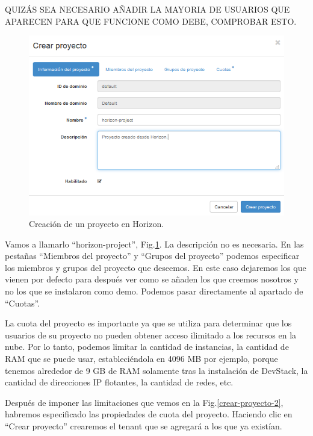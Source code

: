 \begin{tcolorbox}[colback=red!5!red,colframe=red!75!black]
QUIZÁS SEA NECESARIO AÑADIR LA MAYORIA DE USUARIOS QUE APARECEN PARA QUE FUNCIONE COMO DEBE, COMPROBAR ESTO.
\end{tcolorbox}

\begin{figure}
    \centering
    \includegraphics[width=1\textwidth]{imagenes/capitulo6/crear-proyecto-1.PNG}
    \caption{Creación de un proyecto en Horizon.}
	\vspace{0.3cm}
    \label{crear-proyecto-1}
\end{figure}

Vamos a llamarlo “horizon-project”, Fig.\ref{crear-proyecto-1}. La descripción no es necesaria. En las pestañas “Miembros del proyecto” y “Grupos del proyecto” podemos especificar los miembros y grupos del proyecto que deseemos. En este caso dejaremos los que vienen por defecto para después ver como se añaden los que creemos nosotros y no los que se instalaron como demo. Podemos pasar directamente al apartado de “Cuotas”.

La cuota del proyecto es importante ya que se utiliza para determinar que los usuarios de su proyecto no pueden obtener acceso ilimitado a los recursos en la nube. Por lo tanto, podemos limitar la cantidad de instancias, la cantidad de RAM que se puede usar, estableciéndola en 4096 MB por ejemplo, porque tenemos alrededor de 9 GB de RAM solamente tras la instalación de DevStack, la cantidad de direcciones IP flotantes, la cantidad de redes, etc.

Después de imponer las limitaciones que vemos  en la Fig.\ref{crear-proyecto-2}, habremos especificado  las propiedades de cuota del proyecto. Haciendo  clic en “Crear proyecto” crearemos el tenant que se agregará a los que ya existían.


